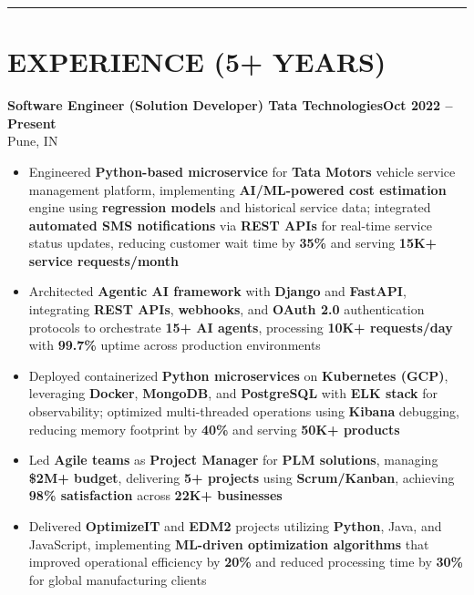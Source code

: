 \documentclass[10pt,a4paper]{article}
\begin{document}
\vspace{2pt}
\noindent\rule{\textwidth}{0.8pt}

\section*{EXPERIENCE (5+ YEARS)}

{\small
\noindent
\textbf{Software Engineer (Solution Developer) \textbf{\textbar{}} Tata Technologies}\hfill\textbf{Oct 2022 -- Present}\\[-2pt]
{\small Pune, IN}
\begin{itemize}[leftmargin=0.3in, itemsep=1.5pt, topsep=0pt, parsep=0pt, partopsep=0pt, label=$\circ$]
    \item Engineered \textbf{Python-based microservice} for \textbf{Tata Motors} vehicle service management platform, implementing \textbf{AI/ML-powered cost estimation} engine using \textbf{regression models} and historical service data; integrated \textbf{automated SMS notifications} via \textbf{REST APIs} for real-time service status updates, reducing customer wait time by \textbf{35\%} and serving \textbf{15K+ service requests/month}
    \item Architected \textbf{Agentic AI framework} with \textbf{Django} and \textbf{FastAPI}, integrating \textbf{REST APIs}, \textbf{webhooks}, and \textbf{OAuth 2.0} authentication protocols to orchestrate \textbf{15+ AI agents}, processing \textbf{10K+ requests/day} with \textbf{99.7\%} uptime across production environments
    \item Deployed containerized \textbf{Python microservices} on \textbf{Kubernetes (GCP)}, leveraging \textbf{Docker}, \textbf{MongoDB}, and \textbf{PostgreSQL} with \textbf{ELK stack} for observability; optimized multi-threaded operations using \textbf{Kibana} debugging, reducing memory footprint by \textbf{40\%} and serving \textbf{50K+ products}
    \item Led \textbf{Agile teams} as \textbf{Project Manager} for \textbf{PLM solutions}, managing \textbf{\$2M+ budget}, delivering \textbf{5+ projects} using \textbf{Scrum/Kanban}, achieving \textbf{98\% satisfaction} across \textbf{22K+ businesses}
    \item Delivered \textbf{OptimizeIT} and \textbf{EDM2} projects utilizing \textbf{Python}, Java, and JavaScript, implementing \textbf{ML-driven optimization algorithms} that improved operational efficiency by \textbf{20\%} and reduced processing time by \textbf{30\%} for global manufacturing clients
\end{itemize}

}
\end{document}
